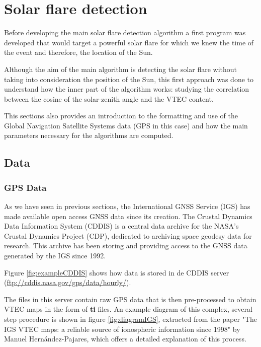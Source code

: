 \chapter{Solar flare detection}

Before developing the main solar flare detection algorithm a first program was developed that would target a powerful solar flare for which we knew the time of the event and therefore, the location of the Sun.

Although the aim of the main algorithm is detecting the solar flare without taking into consideration the position of the Sun, this first approach was done to understand how the inner part of the algorithm works: studying the correlation between the cosine of the solar-zenith angle and the VTEC content.

This sections also provides an introduction to the formatting and use of the Global Navigation Satellite Systems data (GPS in this case) and how the main parameters necessary for the algorithms are computed.

\section{Data}

\subsection{GPS Data}

As we have seen in previous sections, the International GNSS Service (IGS) has made available open access GNSS data since its creation. The Crustal Dynamics Data Information System (CDDIS) is a central data archive for the NASA's Crustal Dynamics Project (CDP), dedicated to archiving space geodesy data for research. This archive has been storing and providing access to the GNSS data generated by the IGS since 1992.

Figure \ref{fig:exampleCDDIS} shows how data is stored in de CDDIS server (\url{ftp://cddis.nasa.gov/gps/data/hourly/}).

The files in this server contain raw GPS data that is then pre-processed to obtain VTEC maps in the form of \textbf{ti} files. An example diagram of this complex, several step procedure is shown in figure \ref{fig:diagramIGS}, extracted from the paper "The IGS VTEC maps: a reliable source of ionospheric information since 1998" \cite{hernandez2009igs} by Manuel Hernández-Pajares, which offers a detailed explanation of this process. 

